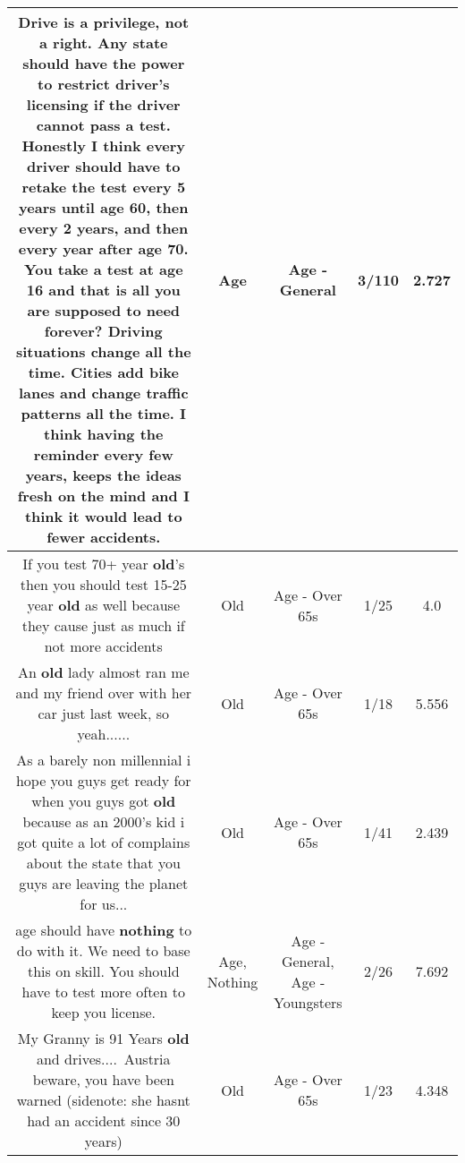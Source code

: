 \documentclass[11pt]{article}
\newlength\mylength
\begin{document}
\begin{center}
\begin{longtable}{|C{.65\mylength}|C{.30\mylength}|C{.12\mylength}|C{.12\mylength}|C{.12\mylength}|}
  \small Drive is a privilege, not a right. Any state should have the power to restrict driver's licensing if the driver cannot pass a test. Honestly I think every driver should have to retake the test every 5 years until \textbf{age} 60, then every 2 years, and then every year after \textbf{age} 70. You take a test at \textbf{age} 16 and that is all you are supposed to need forever? Driving situations change all the time. Cities add bike lanes and change traffic patterns all the time. I think having the reminder every few years, keeps the ideas fresh on the mind and I think it would lead to fewer accidents.\normalsize   & Age & Age - General & 3/110 & 2.727 \\  \hline
  \small If you test 70+ year \textbf{old}'s then you should test 15-25 year \textbf{old} as well because they cause just as much if not more accidents\normalsize   & Old & Age - Over 65s & 1/25 & 4.0 \\  \hline
  \small An \textbf{old} lady almost ran me and my friend over with her car just last week, so yeah......\normalsize   & Old & Age - Over 65s & 1/18 & 5.556 \\  \hline
  \small As a barely non millennial i hope you guys get ready for when you guys got \textbf{old} because as an 2000's kid i got quite a lot of complains about the state that you guys are leaving the planet for us...\normalsize   & Old & Age - Over 65s & 1/41 & 2.439 \\  \hline
  \small age should have \textbf{nothing} to do with it.  We need to base this on skill.  You should have to test more often to keep you license.\normalsize   & Age, Nothing & Age - General, Age - Youngsters & 2/26 & 7.692 \\  \hline
  \small My Granny is 91 Years \textbf{old} and drives.... Austria beware, you have been warned (sidenote: she hasnt had an accident since 30 years)\normalsize   & Old & Age - Over 65s & 1/23 & 4.348 \\  \hline

\end{longtable}
\end{center}
\end{document}
